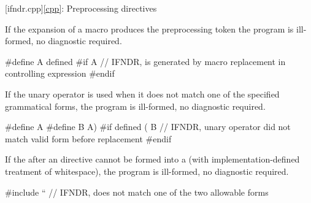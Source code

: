 [ifndr.cpp]{\ref*{cpp}: Preprocessing directives}


\pnum
If the expansion of a macro produces the preprocessing token 
the program is ill-formed, no diagnostic required.

\pnum
\begin{example}
\begin{codeblock}
#define A defined
#if A   // IFNDR,  is generated by macro replacement in controlling expression
#endif
\end{codeblock}
\end{example}


\pnum
If the  unary operator is used when it
does not match
one of the specified grammatical forms,
the program is ill-formed, no diagnostic required.

\pnum
\begin{example}
\begin{codeblock}
#define A
#define B A)
#if defined ( B // IFNDR, unary operator  did not match valid form before replacement
#endif
\end{codeblock}
\end{example}


\pnum
If the  after
an  directive
cannot be formed into a 
(with imp\-lementation-defined treatment of whitespace),
the program is ill-formed, no diagnostic required.

\pnum
\begin{example}
\begin{codeblock}
#include ``     // IFNDR, does not match one of the two allowable forms
\end{codeblock}
\end{example}
